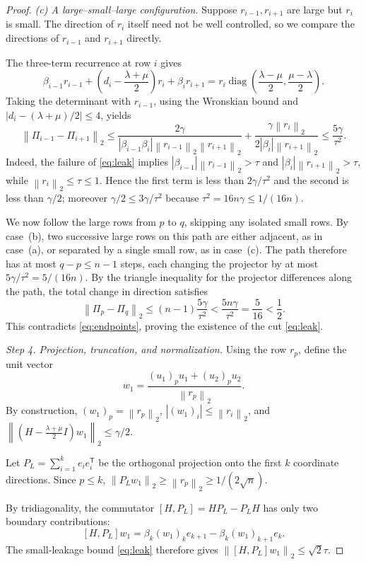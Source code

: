 \documentclass[10pt,a4paper]{article}
\newcommand{\norm}[1]{\left\lVert #1\right\rVert}
\DeclareMathOperator{\diag}{diag}
\begin{document}
\begin{proof}
\emph{(c) A large--small--large configuration.}
Suppose $r_{i-1},r_{i+1}$ are large but $r_i$
is small. The direction of $r_i$ itself need
not be well controlled, so we compare the
directions of $r_{i-1}$ and $r_{i+1}$ directly.

The three-term recurrence at row $i$ gives
\[
\beta_{i-1}r_{i-1}
+\left(d_i-\frac{\lambda+\mu}{2}\right)r_i
+\beta_ir_{i+1}
=
r_i\diag\left(\frac{\lambda-\mu}{2},
\frac{\mu-\lambda}{2}\right).
\]
Taking the determinant with $r_{i-1}$,
using the Wronskian bound and
$|d_i-(\lambda+\mu)/2|\leq4$, yields
\[
\norm{\Pi_{i-1}-\Pi_{i+1}}_2
\leq
\frac{2\gamma}
{|\beta_{i-1}\beta_i|
\norm{r_{i-1}}_2\norm{r_{i+1}}_2}
+
\frac{\gamma\norm{r_i}_2}
{2|\beta_i|\norm{r_{i+1}}_2}
\leq\frac{5\gamma}{\tau^2}.
\]
Indeed, the failure of \eqref{eq:leak} implies
$|\beta_{i-1}|\norm{r_{i-1}}_2>\tau$
and $|\beta_i|\norm{r_{i+1}}_2>\tau$,
while $\norm{r_i}_2\leq\tau\leq1$.
Hence the first term is less than $2\gamma/\tau^2$ and
the second is less than $\gamma/2$; moreover
$\gamma/2\leq3\gamma/\tau^2$ because
$\tau^2=16n\gamma\leq1/(16n)$.

We now follow the large rows from $p$ to $q$,
skipping any isolated small rows. By case~(b),
two successive large rows on this path are either
adjacent, as in case~(a), or separated by a single
small row, as in case~(c). The path therefore has
at most $q-p\leq n-1$ steps, each changing the
projector by at most
$5\gamma/\tau^2=5/(16n)$. By the triangle inequality
for the projector differences along the path,
the total change in direction satisfies
\[
\norm{\Pi_p-\Pi_q}_2
\leq(n-1)\frac{5\gamma}{\tau^2}
<\frac{5n\gamma}{\tau^2}
=\frac5{16}<\frac12.
\]
This contradicts \eqref{eq:endpoints}, proving
the existence of the cut \eqref{eq:leak}.

\emph{Step 4. Projection, truncation, and normalization.}
Using the row $r_p$, define the unit vector
\[
w_1=
\frac{(u_1)_p u_1+(u_2)_p u_2}{\norm{r_p}_2}.
\]
By construction, $(w_1)_p=\norm{r_p}_2$,
$|(w_1)_i|\leq\norm{r_i}_2$, and
$\left\lVert(H-\frac{\lambda+\mu}{2}I)w_1
\right\rVert_2\leq\gamma/2$.

Let $P_L=\sum_{i=1}^k e_ie_i^{\mathsf T}$
be the orthogonal projection onto the first
$k$ coordinate directions. Since $p\leq k$,
$\norm{P_Lw_1}_2\geq\norm{r_p}_2\geq1/(2\sqrt n)$.

By tridiagonality, the commutator
$[H,P_L]=HP_L-P_LH$ has only two boundary
contributions:
\[
[H,P_L]w_1
=\beta_k(w_1)_ke_{k+1}
-\beta_k(w_1)_{k+1}e_k.
\]
The small-leakage bound \eqref{eq:leak}
therefore gives
$\norm{[H,P_L]w_1}_2\leq\sqrt2\tau$.


\end{proof}
\end{document}
